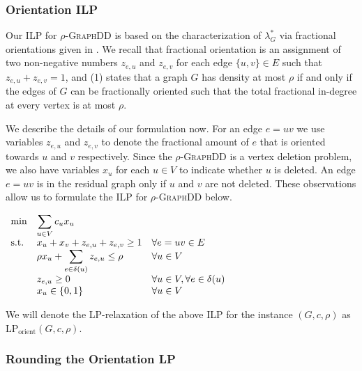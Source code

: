 \documentclass{article}
\newcommand{\densitydeletionset}{\textsc{GraphDD}\xspace}
\newcommand{\rhodensitydeletionset}{\ensuremath{\rho\text{-}}\densitydeletionset\xspace}
\begin{document}
\subsubsection{Orientation ILP}


Our ILP for \rhodensitydeletionset is based on the characterization of $\lambda^*_G$ via fractional orientations given in . We recall that fractional orientation is an assignment of
two non-negative numbers $z_{e,u}$ and $z_{e,v}$ for each edge $\{u,v\} \in E$ such that 
$z_{e, u}+ z_{e,v}=1$, and
(1) states that a graph $G$ has density at most $\rho$
if and only if the edges of $G$ can be fractionally oriented such that the total fractional in-degree at every vertex is at most $\rho$.

We describe the details of our formulation now. For an edge $e=uv$ we use variables $z_{e,u}$
and $z_{e,v}$ to denote the fractional amount of $e$ that is oriented towards $u$ and $v$
respectively. Since the \rhodensitydeletionset is a vertex deletion problem, we also have variables
$x_u$ for each $u \in V$ to indicate whether $u$ is deleted. An edge $e=uv$ is in
the residual graph only if $u$ and $v$ are not deleted. These observations
allow us to formulate the ILP for \rhodensitydeletionset below.
\begin{center}
$\begin{array}{ll@{}ll}
        \text{min}  &\displaystyle\sum\limits_{u \in V} c_ux_{u}&   &\\
\text{s.t.}& x_u + x_v + z_{e, u} + z_{e, v} \geq 1 & & \forall e = uv \in E\\
        &\rho x_u + \displaystyle\sum\limits_{e\in \delta(u)}z_{e, u} \leq \rho &    & \forall u \in V \\
        &z_{e,u} \geq 0&&\forall u \in V, \forall e \in \delta(u)\\
        &x_u \in \{0, 1\}&&\forall u \in V
    \end{array}$ 
\end{center}
We will denote the LP-relaxation of the above ILP for the instance $(G, c, \rho)$ as $\text{LP}_{\text{orient}}(G, c, \rho)$.
\subsubsection{Rounding the Orientation LP}\label{sec:rounding-orientation-LP}
\end{document}
